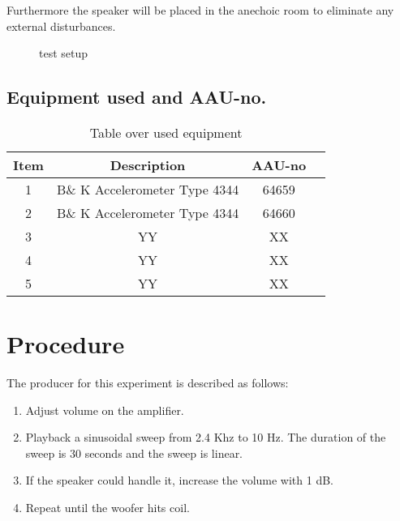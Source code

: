 Furthermore the speaker will be placed in the anechoic room to eliminate any external disturbances.

\begin{figure}[H]
\centering
{}
\caption{test setup}
\label{figure:SpeakertestSetup}
\end{figure}

\subsection*{Equipment used and AAU-no.}

\begin{table}[H]
\centering
{}
\begin{tabular}{S[table-format=1]ccc} \toprule
    {Item} & {Description} & {AAU-no} \\       &  B\& K Accelerometer Type 4344  & 64659   \\ 
    2      &  B\& K Accelerometer Type 4344  & 64660   \\ 
    3      & YY  & XX   \\
    4      & YY  & XX   \\ 
    5      & YY  & XX  \\ \bottomrule 
\end{tabular}
\caption{Table over used equipment}
\end{table}



\section{Procedure}\label{sec:SpeakerTestProcedure}

The producer for this experiment is described as follows:
\begin{enumerate}
\item Adjust volume on the amplifier.
\item Playback a sinusoidal sweep from 2.4 Khz to 10 Hz. The duration of the sweep is 30 seconds and the sweep is linear.
\item If the speaker could handle it, increase the volume with 1 dB.
\item Repeat until the woofer hits coil. 
\end{enumerate}


\begin{figure}[H]
\centering
{}

\caption{}
\label{fig:linear_freq_sweep}
\end{figure}

